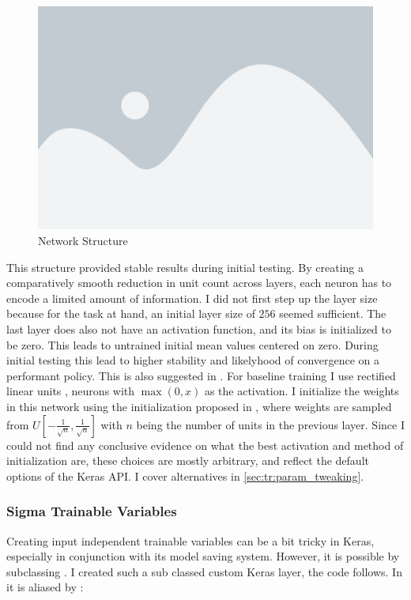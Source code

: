 \begin{figure}[H]
    \centering
    \includegraphics[width=0.5\linewidth]{figures/placeholder.png}
    \caption{Network Structure}
    \label{fig:network_repr}
\end{figure}

\noindent
This structure provided stable results during initial testing. By creating a comparatively smooth reduction in unit count across layers, each neuron has to encode a limited amount of information. I did not first step up the layer size because for the task at hand, an initial layer size of $256$ seemed sufficient. The last layer does also not have an activation function, and its bias is initialized to be zero. This leads to untrained initial mean values centered on zero. During initial testing this lead to higher stability and likelyhood of convergence on a performant policy. This is also suggested in . For baseline training I use rectified linear units \cite[pg. 189]{Goodfellow-et-al-2016}, neurons with $\max(0, x)$ as the activation. I initialize the weights in this network using the initialization proposed in \cite[p. 251]{glorot_understanding_2010}, where weights are sampled from $U\left[ -\frac{1}{\sqrt{n}}, \frac{1}{\sqrt{n}} \right]$ with $n$ being the number of units in the previous layer. Since I could not find any conclusive evidence on what the best activation and method of initialization are, these choices are mostly arbitrary, and reflect the default options of the Keras API. I cover alternatives in \ref{sec:tr:param_tweaking}.

\subsubsection{Sigma Trainable Variables}\label{subsubsec:ip:agent:policy:std}
Creating input independent trainable variables can be a bit tricky in Keras, especially in conjunction with its model saving system. However, it is possible by subclassing . I created such a sub classed custom Keras layer, the code follows. In it  is aliased by :

